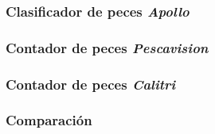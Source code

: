 \subsubsection{Clasificador de peces \textit{Apollo}}

\subsubsection{Contador de peces \textit{Pescavision}}

\subsubsection{Contador de peces \textit{Calitri}}

\subsubsection{Comparación}



